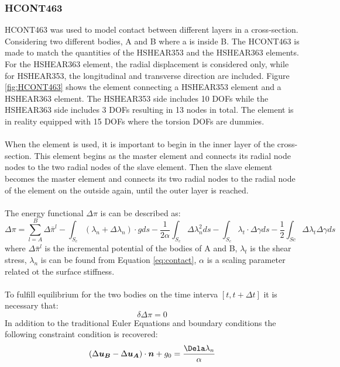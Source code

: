 \subsubsection{HCONT463}
HCONT463 was used to model contact between different layers in a cross-section.  Considering two different bodies, A and B where a is inside B. The HCONT463 is made to match the quantities of the HSHEAR353 and the HSHEAR363 elements. For the HSHEAR363 element, the radial displacement is considered only, while for HSHEAR353, the longitudinal and transverse direction are included. Figure \ref{fig:HCONT463} shows the element connecting a HSHEAR353 element and a HSHEAR363 element. The HSHEAR353 side includes 10 DOFs while the HSHEAR363 side includes 3 DOFs resulting in 13 nodes in total. The element is in reality equipped with 15 DOFs where the torsion DOFs are dummies.\\\\ When the element is used, it is important to begin in the inner layer of the cross-section. This element begins as the master element and connects its radial node nodes to the two radial nodes of the slave element. Then the slave element becomes the master element and connects its two radial nodes to the radial node of the element on the outside again, until the outer layer is reached.\\\\The energy functional $\Delta \pi$ is can be described as:
\begin{equation}
    \Delta \pi = \sum_{l=A}^B \Delta \bar{\pi}^{l} - \int_{S_c} (\lambda_n + \Delta \lambda_n) \cdot gds - \frac{1}{2 \alpha} \int_{S_c} \Delta \lambda_n^2 ds - \int_{S_c} \lambda_t \cdot \Delta \gamma ds - \frac{1}{2} \int_{Sc} \Delta \lambda_t \Delta \gamma ds
    \label{eq:energy}
\end{equation}
where $\Delta \bar{\pi}^{l}$ is the incremental potential of the bodies of A and B, $\lambda_t$ is the shear stress, $\lambda_n$ is can be found from Equation \ref{eq:contact}, $\alpha$ is a scaling parameter related ot the surface stiffness. \\\\ To fulfill equilibrium for the two bodies on the time interva $[t,t+\Delta t]$ it is necessary that:
\begin{equation}
    \delta \Delta \pi =0
\end{equation}
In addition to the traditional Euler Equations and boundary conditions the following constraint condition is recovered: 
\begin{equation}
    (\Delta \boldsymbol{u_B} - \Delta \boldsymbol{u_A}) \cdot \boldsymbol{n} + g_0=\frac{\Dela \lambda_n}{\alpha}
    \label{eq:contact}
\end{equation}
